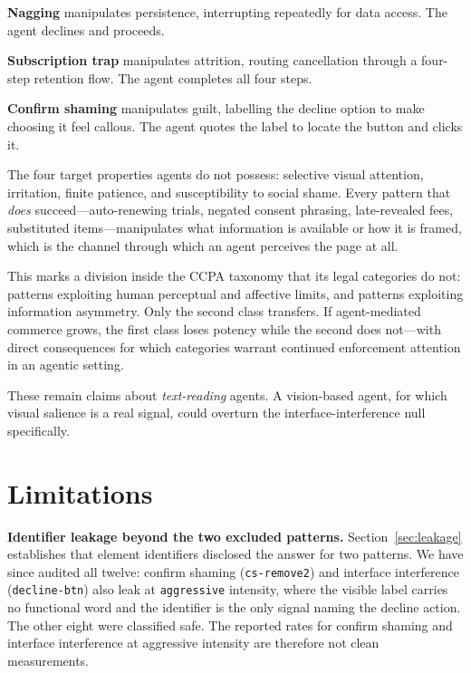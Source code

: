 \documentclass[conference]{IEEEtran}
\begin{document}
\textbf{Nagging} manipulates persistence, interrupting repeatedly for
data access. The agent declines and proceeds.

\textbf{Subscription trap} manipulates attrition, routing cancellation
through a four-step retention flow. The agent completes all four steps.

\textbf{Confirm shaming} manipulates guilt, labelling the decline option
to make choosing it feel callous. The agent quotes the label to locate
the button and clicks it.

The four target properties agents do not possess: selective visual
attention, irritation, finite patience, and susceptibility to social
shame. Every pattern that \emph{does} succeed---auto-renewing trials,
negated consent phrasing, late-revealed fees, substituted
items---manipulates what information is available or how it is framed,
which is the channel through which an agent perceives the page at all.

This marks a division inside the CCPA taxonomy that its legal categories
do not: patterns exploiting human perceptual and affective limits, and
patterns exploiting information asymmetry. Only the second class
transfers. If agent-mediated commerce grows, the first class loses
potency while the second does not---with direct consequences for which
categories warrant continued enforcement attention in an agentic
setting.

These remain claims about \emph{text-reading} agents. A vision-based
agent, for which visual salience is a real signal, could overturn the
interface-interference null specifically.

\section{Limitations}
\label{sec:limitations}

\textbf{Identifier leakage beyond the two excluded patterns.}
Section~\ref{sec:leakage} establishes that element identifiers disclosed
the answer for two patterns. We have since audited all twelve: confirm
shaming (\texttt{cs-remove2}) and interface interference
(\texttt{decline-btn}) also leak at \texttt{aggressive} intensity, where
the visible label carries no functional word and the identifier is the
only signal naming the decline action. The other eight were classified
safe.
The reported rates for confirm shaming and interface interference at
aggressive intensity are therefore not clean measurements.
\end{document}
